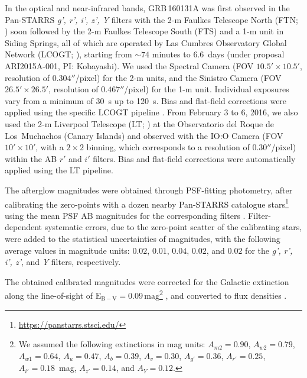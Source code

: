 \documentclass{aa}
\begin{document}
In the optical and near-infrared bands, GRB\,160131A was first observed in the Pan-STARRS {\it g', r', i', z', Y} filters with the 2-m Faulkes Telescope North (FTN; \citealt{Guidorzi16}) soon followed by the 2-m Faulkes Telescope South (FTS) and a 1-m unit in Siding Springs, all of which are operated by Las Cumbres Observatory Global Network (LCOGT; \citealt{LCO13}), starting from $\sim 74$ minutes to $6.6$~days (under proposal ARI2015A-001, PI: Kobayashi). We used the Spectral Camera (FOV $10.5' \times 10.5'$, resolution of $0.304''$/pixel) for the 2-m units, and the Sinistro Camera (FOV $26.5'\times 26.5'$, resolution of $0.467''$/pixel) for the 1-m unit. Individual exposures vary from a minimum of 30~s up to 120~s. Bias and flat-field corrections were applied using the specific LCOGT pipeline \citep{LCO13}. From February 3 to 6, 2016, we also used the 2-m Liverpool Telescope (LT; \citealt{Steele04,Guidorzi06}) at the Observatorio del Roque de Los~Muchachos (Canary Islands) and observed with the IO:O Camera (FOV $10'\times10'$, with a $2\times2$ binning, which corresponds to a resolution of $0.30''$/pixel) within the AB $r'$ and $i'$ filters. Bias and flat-field corrections were automatically applied using the LT pipeline.

The afterglow magnitudes were obtained through PSF-fitting photometry, after calibrating the zero-points with a dozen nearby Pan-STARRS catalogue stars\footnote{\url{https://panstarrs.stsci.edu/}} using the mean PSF AB magnitudes for the corresponding filters \citep{Tonry12}. Filter-dependent systematic errors, due to the zero-point scatter of the calibrating stars, were added to the statistical uncertainties of magnitudes, with the following average values in magnitude units: $0.02$, $0.01$, $0.04$, $0.02$, and $0.02$ for the {\it g', r', i', z'}, and {\it Y} filters, respectively.

The obtained calibrated magnitudes were corrected for the Galactic extinction along the line-of-sight of $\mathrm{E_{B-V}} = 0.09\,\mathrm{mag}$\footnote{We assumed the following extinctions in mag units: $A_{m2} = 0.90$, $A_{w2} = 0.79$, $A_{w1} = 0.64$, $A_{u} = 0.47$, $A_{b} = 0.39$, $A_{v} = 0.30$, $A_{g'} = 0.36$, $A_{r'} = 0.25$, $A_{i'} = 0.18$~mag, $A_{z'} = 0.14$, and $A_{Y}=0.12$.} \citep{Schlafly11}, and converted to flux densities \citep{Fukugita96}.
\end{document}
